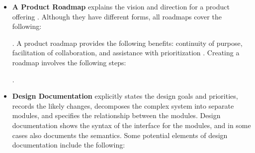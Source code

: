 \documentclass[11pt]{article}
\begin{document}
\begin{itemize}
\item \textbf{A Product Roadmap} explains the vision and direction for a product
offering \cite{MunchEtAl2019}.  Although they have different forms, all
roadmaps cover the following:  \cite{PhaalEtAl2005}. A product
roadmap provides the following benefits: continuity of purpose, facilitation of
collaboration, and assistance with prioritization \cite{Pichler2012}. Creating a
roadmap involves the following steps:
 \cite{VahaniittyEtAl2002}.  

\item \textbf{Design Documentation} explicitly states the design goals and
priorities, records the likely changes, decomposes the complex system into
separate modules, and specifies the relationship between the modules. Design
documentation shows the syntax of the interface for the modules, and in some
cases also documents the semantics.  Some potential elements of design
documentation include the following:


\end{itemize}
\end{document}
